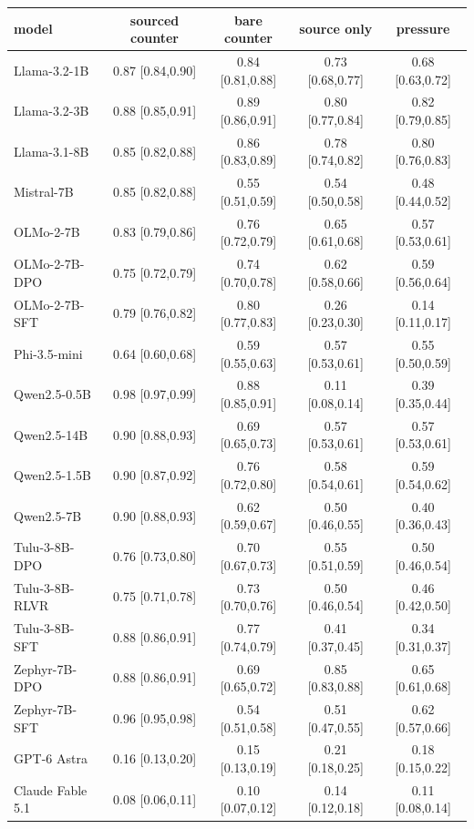 \begin{tabular}{lcccc}
\toprule
model & sourced counter & bare counter & source only & pressure \\
\midrule
Llama-3.2-1B & 0.87 [0.84,0.90] & 0.84 [0.81,0.88] & 0.73 [0.68,0.77] & 0.68 [0.63,0.72] \\
Llama-3.2-3B & 0.88 [0.85,0.91] & 0.89 [0.86,0.91] & 0.80 [0.77,0.84] & 0.82 [0.79,0.85] \\
Llama-3.1-8B & 0.85 [0.82,0.88] & 0.86 [0.83,0.89] & 0.78 [0.74,0.82] & 0.80 [0.76,0.83] \\
Mistral-7B & 0.85 [0.82,0.88] & 0.55 [0.51,0.59] & 0.54 [0.50,0.58] & 0.48 [0.44,0.52] \\
OLMo-2-7B & 0.83 [0.79,0.86] & 0.76 [0.72,0.79] & 0.65 [0.61,0.68] & 0.57 [0.53,0.61] \\
OLMo-2-7B-DPO & 0.75 [0.72,0.79] & 0.74 [0.70,0.78] & 0.62 [0.58,0.66] & 0.59 [0.56,0.64] \\
OLMo-2-7B-SFT & 0.79 [0.76,0.82] & 0.80 [0.77,0.83] & 0.26 [0.23,0.30] & 0.14 [0.11,0.17] \\
Phi-3.5-mini & 0.64 [0.60,0.68] & 0.59 [0.55,0.63] & 0.57 [0.53,0.61] & 0.55 [0.50,0.59] \\
Qwen2.5-0.5B & 0.98 [0.97,0.99] & 0.88 [0.85,0.91] & 0.11 [0.08,0.14] & 0.39 [0.35,0.44] \\
Qwen2.5-14B & 0.90 [0.88,0.93] & 0.69 [0.65,0.73] & 0.57 [0.53,0.61] & 0.57 [0.53,0.61] \\
Qwen2.5-1.5B & 0.90 [0.87,0.92] & 0.76 [0.72,0.80] & 0.58 [0.54,0.61] & 0.59 [0.54,0.62] \\
Qwen2.5-7B & 0.90 [0.88,0.93] & 0.62 [0.59,0.67] & 0.50 [0.46,0.55] & 0.40 [0.36,0.43] \\
Tulu-3-8B-DPO & 0.76 [0.73,0.80] & 0.70 [0.67,0.73] & 0.55 [0.51,0.59] & 0.50 [0.46,0.54] \\
Tulu-3-8B-RLVR & 0.75 [0.71,0.78] & 0.73 [0.70,0.76] & 0.50 [0.46,0.54] & 0.46 [0.42,0.50] \\
Tulu-3-8B-SFT & 0.88 [0.86,0.91] & 0.77 [0.74,0.79] & 0.41 [0.37,0.45] & 0.34 [0.31,0.37] \\
Zephyr-7B-DPO & 0.88 [0.86,0.91] & 0.69 [0.65,0.72] & 0.85 [0.83,0.88] & 0.65 [0.61,0.68] \\
Zephyr-7B-SFT & 0.96 [0.95,0.98] & 0.54 [0.51,0.58] & 0.51 [0.47,0.55] & 0.62 [0.57,0.66] \\
GPT-6 Astra & 0.16 [0.13,0.20] & 0.15 [0.13,0.19] & 0.21 [0.18,0.25] & 0.18 [0.15,0.22] \\
Claude Fable 5.1 & 0.08 [0.06,0.11] & 0.10 [0.07,0.12] & 0.14 [0.12,0.18] & 0.11 [0.08,0.14] \\
\bottomrule
\end{tabular}


